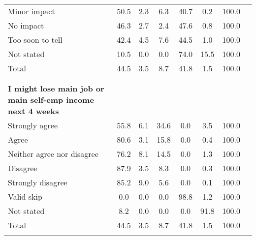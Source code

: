 \begin{tabular*}{\hsize}{ @{\extracolsep{\fill}}l*{7}{c}}
\hspace{0.25cm}Minor impact                                       & 50.5 &  2.3 &  6.3 & 40.7 &  0.2 & 100.0\\ 
\hspace{0.25cm}No impact                                          & 46.3 &  2.7 &  2.4 & 47.6 &  0.8 & 100.0\\ 
\hspace{0.25cm}Too soon to tell                                   & 42.4 &  4.5 &  7.6 & 44.5 &  1.0 & 100.0\\ 
\hspace{0.25cm}Not stated                                         & 10.5 &  0.0 &  0.0 & 74.0 & 15.5 & 100.0\\ 
\hspace{0.25cm}Total                                              & 44.5 &  3.5 &  8.7 & 41.8 &  1.5 & 100.0\\

\\
\hline
\\
\hspace{0.25cm}\textbf{I might lose main job or main self-emp income next 4 weeks} \\ 
\hspace{0.25cm}Strongly agree                                     & 55.8 &  6.1 & 34.6 &  0.0 &  3.5 & 100.0\\ 
\hspace{0.25cm}Agree                                              & 80.6 &  3.1 & 15.8 &  0.0 &  0.4 & 100.0\\ 
\hspace{0.25cm}Neither agree nor disagree                         & 76.2 &  8.1 & 14.5 &  0.0 &  1.3 & 100.0\\ 
\hspace{0.25cm}Disagree                                           & 87.9 &  3.5 &  8.3 &  0.0 &  0.3 & 100.0\\ 
\hspace{0.25cm}Strongly disagree                                  & 85.2 &  9.0 &  5.6 &  0.0 &  0.1 & 100.0\\ 
\hspace{0.25cm}Valid skip                                         &  0.0 &  0.0 &  0.0 & 98.8 &  1.2 & 100.0\\ 
\hspace{0.25cm}Not stated                                         &  8.2 &  0.0 &  0.0 &  0.0 & 91.8 & 100.0\\ 
\hspace{0.25cm}Total                                              & 44.5 &  3.5 &  8.7 & 41.8 &  1.5 & 100.0\\
\\
\hline \hline
\end{tabular*}
